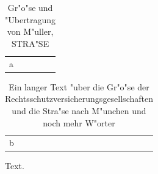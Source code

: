 \documentclass{article}
\begin{document}
\listoftables
\begin{table}[h]
\centering
\begin{tabular}{l}
a
\end{tabular}
\caption{Gr"o"se und "Ubertragung von M"uller, STRA"SE}
\end{table}
\begin{table}[h]
\centering
\begin{tabular}{l}
b
\end{tabular}
\caption{Ein langer Text "uber die Gr"o"se der Rechtsschutzversicherungsgesellschaften und die Stra"se nach M"unchen und noch mehr W"orter}
\end{table}
Text.
\end{document}

